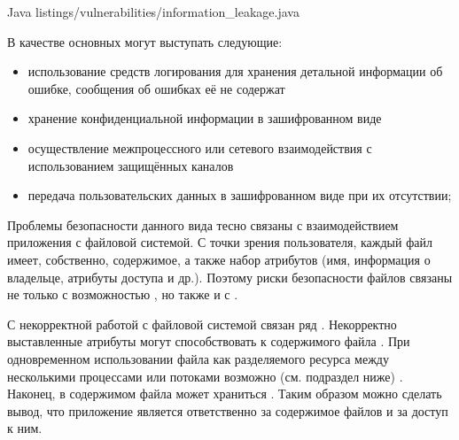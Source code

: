 	{Java}
	{listings/vulnerabilities/information_leakage.java}

%
В качестве основных  могут выступать следующие:
\begin{itemize}
	
	\item использование средств логирования для хранения детальной информации об ошибке, сообщения об ошибках её не содержат

	\item хранение конфиденциальной информации в зашифрованном виде
	
	\item осуществление межпроцессного или сетевого взаимодействия с использованием защищённых каналов
	
	\item передача пользовательских данных в зашифрованном виде при их отсутствии;
\end{itemize}



%
Проблемы безопасности данного вида тесно связаны с взаимодействием приложения с файловой системой. 
%
С точки зрения пользователя, каждый файл имеет, собственно, содержимое, а также набор атрибутов (имя, информация о владельце, атрибуты доступа и др.). 
%
Поэтому риски безопасности файлов связаны не только с возможностью , но также и с  .

%
С некорректной работой с файловой системой связан ряд . 
%
Некорректно выставленные атрибуты могут способствовать к  содержимого файла . 
%
При одновременном использовании файла как разделяемого ресурса между несколькими процессами или потоками возможно  (см. подраздел ниже)  . 
%
Наконец, в содержимом файла может храниться  . 
%
Таким образом можно сделать вывод, что приложение является ответственно за содержимое файлов и за доступ к ним.

